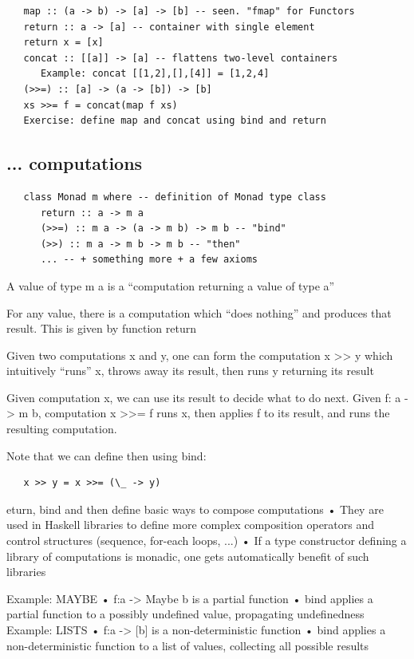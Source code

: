 \begin{lstlisting}
   map :: (a -> b) -> [a] -> [b] -- seen. "fmap" for Functors
   return :: a -> [a] -- container with single element
   return x = [x]
   concat :: [[a]] -> [a] -- flattens two-level containers
      Example: concat [[1,2],[],[4]] = [1,2,4]
   (>>=) :: [a] -> (a -> [b]) -> [b]
   xs >>= f = concat(map f xs)
   Exercise: define map and concat using bind and return
\end{lstlisting}

\subsection{... computations}

\begin{lstlisting}
   class Monad m where -- definition of Monad type class
      return :: a -> m a
      (>>=) :: m a -> (a -> m b) -> m b -- "bind"
      (>>) :: m a -> m b -> m b -- "then"
      ... -- + something more + a few axioms
\end{lstlisting}
A value of type m a is a “computation returning a value of type a”

For any value, there is a computation which “does nothing” and
produces that result. This is given by function return

Given two computations x and y, one can form the computation
x >> y which intuitively “runs” x, throws away its result, then runs
y returning its result

Given computation x, we can use its result to decide what to do next.
Given f: a -> m b, computation x >>= f runs x, then applies
f to its result, and runs the resulting computation.

Note that we can define then using bind:
\begin{lstlisting}
   x >> y = x >>= (\_ -> y)
\end{lstlisting}


eturn, bind and then define basic ways to compose computations
• They are used in Haskell libraries to define more complex composition
operators and control structures (sequence, for-each loops, ...)
• If a type constructor defining a library of computations is monadic, one
gets automatically benefit of such libraries

Example: MAYBE
• f:a -> Maybe b is a partial function
• bind applies a partial function to a possibly undefined value, propagating
undefinedness
Example: LISTS
• f:a -> [b] is a non-deterministic function
• bind applies a non-deterministic function to a list of values, collecting all
possible results

